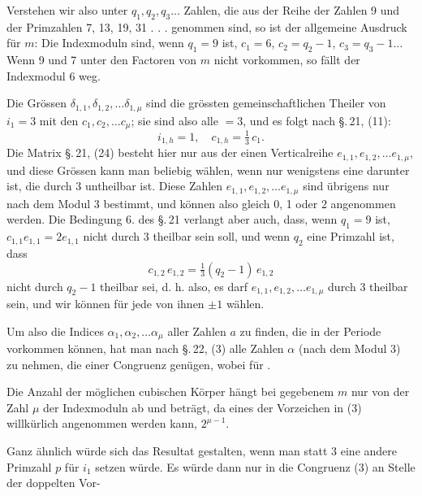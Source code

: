 Verstehen wir also unter $q_1, q_2, q_3 \ldots$ Zahlen, die aus der Reihe der Zahlen 9 und der Primzahlen 7, 13, 19, 31 . . . genommen sind, so ist der allgemeine Ausdruck für $m$:
Die Indexmoduln sind, wenn $q_1=9$ ist, $c_1=6$, $c_2=q_2-1$, $c_3=q_3-1 \ldots$ Wenn 9 und 7 unter den Factoren von $m$ nicht vorkommen, so fällt der Indexmodul 6 weg.

Die Grössen $\delta_{1,1}, \delta_{1,2}, \ldots \delta_{1,\mu}$ sind die grössten gemeinschaftlichen Theiler von $i_1=3$ mit den $c_1, c_2, \ldots c_\mu$; sie sind also alle $=3$, und es folgt nach \S.\,21, (11):
\[
i_{1,h}=1,\quad c_{1,h}=\tfrac{1}{3}\,c_1.
\]
Die Matrix \S.\,21, (24) besteht hier nur aus der einen Verticalreihe $e_{1,1}, e_{1,2}, \ldots e_{1,\mu}$, und diese Grössen kann man beliebig wählen, wenn nur wenigstens eine darunter ist, die durch 3 untheilbar ist. Diese Zahlen $e_{1,1}, e_{1,2}, \ldots e_{1,\mu}$ sind übrigens nur nach dem Modul 3 bestimmt, und können also gleich 0, 1 oder 2 angenommen werden. Die Bedingung 6. des \S.\,21 verlangt aber auch, dass, wenn $q_1=9$ ist, $c_{1,1}e_{1,1}=2e_{1,1}$ nicht durch 3 theilbar sein soll, und wenn $q_2$ eine Primzahl ist, dass
\[
c_{1,2}\,e_{1,2}=\tfrac{1}{3}(q_2-1)\,e_{1,2}
\]
nicht durch $q_2-1$ theilbar sei, d. h. also, es darf  $e_{1,1}, e_{1,2}, \ldots e_{1,\mu}$ durch 3 theilbar sein, und wir können für jede von ihnen $\pm 1$ wählen.

Um also die Indices $\alpha_1, \alpha_2, \ldots \alpha_\mu$ aller Zahlen $a$ zu finden, die in der Periode
vorkommen können, hat man nach \S.\,22, (3) alle Zahlen $\alpha$ (nach dem Modul 3) zu nehmen, die einer Congruenz
genügen, wobei für .

Die Anzahl der möglichen cubischen Körper hängt bei gegebenem $m$ nur von der Zahl $\mu$ der Indexmoduln ab und beträgt, da eines der Vorzeichen in (3) willkürlich angenommen werden kann, $2^{\mu-1}$.

Ganz ähnlich würde sich das Resultat gestalten, wenn man statt 3 eine andere Primzahl $p$ für $i_1$ setzen würde. Es würde dann nur in die Congruenz (3) an Stelle der doppelten Vor-
